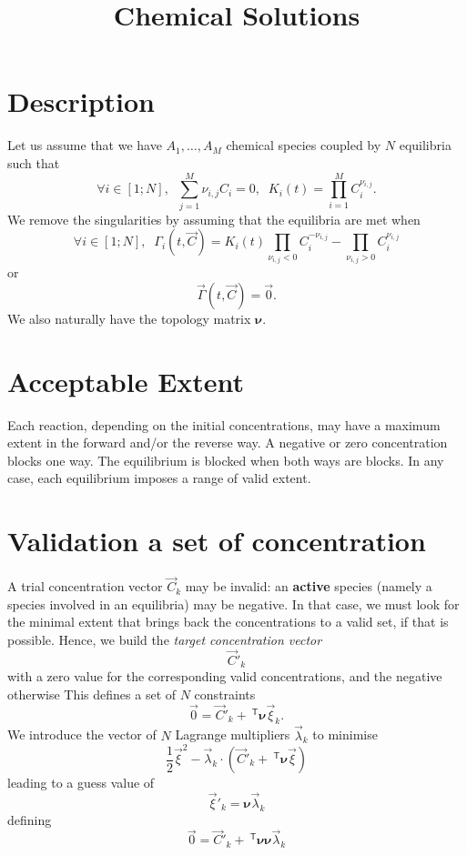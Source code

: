 \documentclass[aps]{revtex4}
\newcommand{\mymat}[1]{\bm{#1}}
\newcommand{\mytrn}[1]{~^{\mathsf{T}}{#1}}
\begin{document}
\title{Chemical Solutions}

\section{Description}
Let us assume that we have $A_1,\ldots,A_M$ chemical species coupled by
$N$ equilibria such that
\begin{equation}
	\forall i \in [1;N], \;\; \sum_{j=1}^{M} \nu_{i,j} C_i = 0, \;\; K_i(t) = \prod_{i=1}^{M} C_i^{\nu_{i,j}}.
\end{equation}
We remove the singularities by assuming that the equilibria are met when
\begin{equation}
	\forall i \in [1;N], \;\; \Gamma_i(t,\vec{C}) = K_i(t) \prod_{\nu_{i,j}<0}  C_i^{-\nu_{i,j}} -  \prod_{\nu_{i,j}>0} C_i^{\nu_{i,j}} 
\end{equation}
or
\begin{equation}
	\vec{\Gamma}(t,\vec{C}) = \vec{0}.
\end{equation}
We also naturally have the topology matrix $\mymat{\nu}$.

\section{Acceptable Extent}
Each reaction, depending on the initial concentrations, may have a maximum extent in the forward and/or the reverse way.
A negative or zero concentration blocks one way. The equilibrium is blocked when both ways are blocks.
In any case, each equilibrium imposes a range of valid extent.

\section{Validation a set of concentration}
A trial concentration vector $\vec{C}_k$ may be invalid: an \textbf{active} species (namely a species involved in an equilibria)
may be negative. In that case, we must look for the minimal extent that brings back the concentrations to a valid set, if that
is possible.
Hence, we build the \textit{target concentration vector}
$$
	\vec{C}'_k
$$
with a zero value for the corresponding valid concentrations, and  the negative otherwise
This defines a set of $N$ constraints
$$
	\vec{0} = \vec{C}'_k + \mytrn{\mymat{\nu}}\vec{\xi}_k.
$$
We introduce the vector of $N$ Lagrange multipliers $\vec{\lambda}_k$ to minimise
$$
	\dfrac{1}{2} \vec{\xi}^2 - \vec{\lambda}_k \cdot \left( \vec{C}'_k + \mytrn{\mymat{\nu}}\vec{\xi}\right)
$$
leading to a guess value of
$$
	\vec{\xi}'_k = \mymat{\nu}\vec{\lambda}_k
$$
defining
$$
	\vec{0} = \vec{C}'_k + \mytrn{\mymat{\nu}}\mymat{\nu}\vec{\lambda}_k
$$
\end{document}
